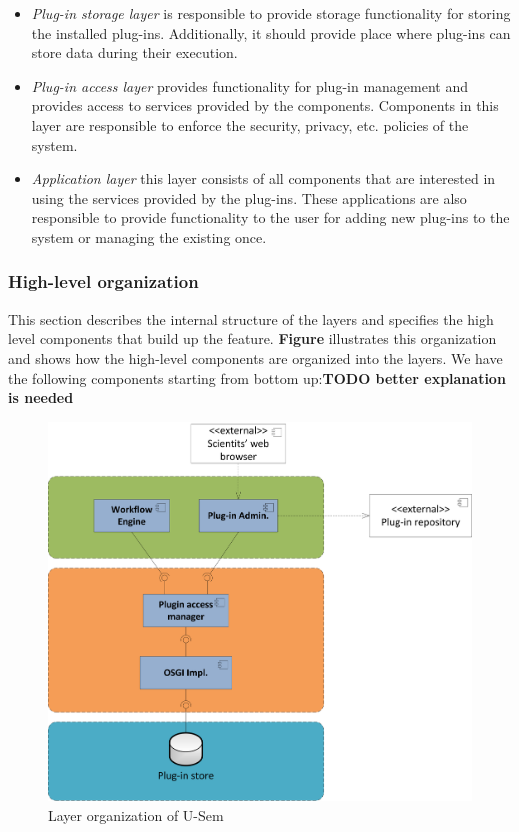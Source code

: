 \begin{itemize}
	\item \textit{Plug-in storage layer} is responsible to provide storage functionality for storing the installed plug-ins. Additionally, it should provide place where plug-ins can store data during their execution.
	\item \textit{Plug-in access layer} provides functionality for plug-in management and provides access to services provided by the components. Components in this layer are responsible to enforce the security, privacy, etc. policies of the system.
	\item \textit{Application layer} this layer consists of all components that are interested in using the services provided by the plug-ins. These applications are also responsible to provide functionality to the user for adding new plug-ins to the system or managing the existing once. 
	\end{itemize}

\subsubsection{High-level organization}

This section describes the internal structure of the layers and specifies the high level components that build up the feature. \textbf{Figure} illustrates this organization and shows how the high-level components are organized into the layers. We have the following components starting from bottom up:\textbf{TODO better explanation is needed}

\begin{figure}[h!]
  \centering
  	\includegraphics[scale=0.6]{plug-in/layers/main-func.png}
  \caption{Layer organization of U-Sem}
\end{figure}

